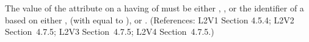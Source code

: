 The value of the  attribute on a \Compartment having
 of  must be either ,
, or the identifier of a \UnitDefinition based on either
,  (with  equal to ), or
.  (References: L2V1 Section 4.5.4; L2V2
Section~4.7.5; L2V3 Section~4.7.5; L2V4 Section~4.7.5.)
